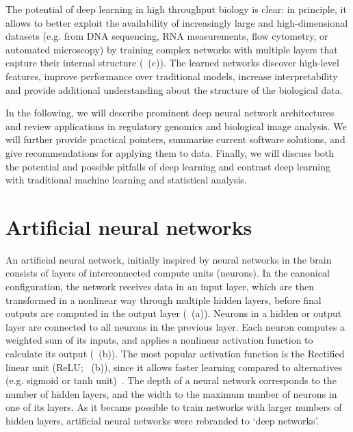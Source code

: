 The potential of deep learning in high throughput biology is clear: in principle, it allows to better exploit the availability of increasingly large and high-dimensional datasets (e.g. from DNA sequencing, RNA measurements, flow cytometry, or automated microscopy) by training complex networks with multiple layers that capture their internal structure (~(c)). The learned networks discover high-level features, improve performance over traditional models, increase interpretability and provide additional understanding about the structure of the biological data.

In the following, we will describe prominent deep neural network architectures and review applications in regulatory genomics and biological image analysis. We will further provide practical pointers, summarise current software solutions, and give recommendations for applying them to data. Finally, we will discuss both the potential and possible pitfalls of deep learning and contrast deep learning with traditional machine learning and statistical analysis.


\section{Artificial neural networks}

An artificial neural network, initially inspired by neural networks in the brain~\citep{farley_simulation_1954,mcculloch_logical_1943,rosenblatt_perceptron:_1958} consists of layers of interconnected compute units (neurons). In the canonical configuration, the network receives data in an input layer, which are then transformed in a nonlinear way through multiple hidden layers, before final outputs are computed in the output layer (~(a)). Neurons in a hidden or output layer are connected to all neurons in the previous layer. Each neuron computes a weighted sum of its inputs, and applies a nonlinear activation function to calculate its output (~(b)). The most popular activation function is the Rectified linear unit (ReLU; ~(b)), since it allows faster learning compared to alternatives (e.g. sigmoid or tanh unit)~\citep{glorot_deep_2011}. The depth of a neural network corresponds to the number of hidden layers, and the width to the maximum number of neurons in one of its layers. As it became possible to train networks with larger numbers of hidden layers, artificial neural networks were rebranded to `deep networks'.

